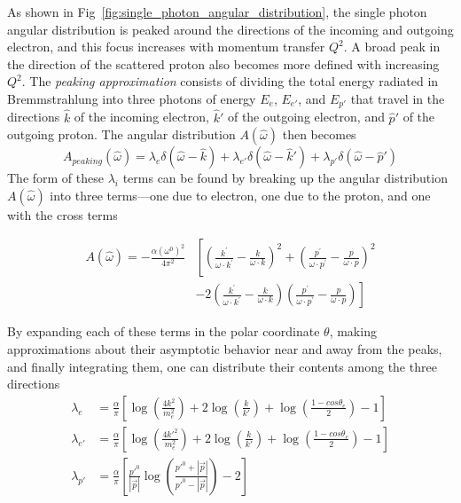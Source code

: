 As shown in Fig~\ref{fig:single_photon_angular_distribution}, the single
photon angular distribution is peaked around the directions of the incoming and
outgoing electron, and this focus increases with momentum transfer $Q^2$.
A broad peak in the direction of the scattered proton also becomes more defined
with increasing $Q^2$.
The \textit{peaking approximation} consists of dividing the total energy
radiated in Bremmstrahlung into three photons of energy $E_e$, $E_{e'}$, and
$E_{p'}$ that travel in the directions
$\hat{k}$ of the incoming electron,
$\hat{k}'$ of the outgoing electron,
and
$\hat{p}'$ of the outgoing proton.
The angular distribution $A(\hat{\omega})$ then becomes
\begin{equation}
    A_{peaking}(\hat{\omega}) = \lambda_{e}  \delta(\hat{\omega}-\hat{k}) +
                                \lambda_{e'} \delta(\hat{\omega}-\hat{k}') +
                                \lambda_{p'} \delta(\hat{\omega}-\hat{p}')
\end{equation}
The form of these $\lambda_i$ terms can be found by breaking up the angular
distribution $A(\hat{\omega})$ into three terms---one due to electron, one
due to the proton, and one with the cross terms

\begin{align}
    A(\hat{\omega}) = -\frac{\alpha(\omega^0)^2}{4\pi^{2}}
                        &\left[\left(\frac{k^{\prime}}{\omega \cdot k^{\prime}}-\frac{k}{\omega \cdot k}\right)^{2}
                        + \left(\frac{p^{\prime}}{\omega \cdot p^{\prime}}-\frac{p}{\omega \cdot p}\right)^{2}\right.\nonumber\\
                        &\left.-2\left(\frac{k^{\prime}}{\omega \cdot k^{\prime}}-\frac{k}{\omega \cdot k}\right)
                        \left(\frac{p^{\prime}}{\omega \cdot p^{\prime}}-\frac{p}{\omega \cdot p}\right) \right]
\end{align}

By expanding each of these terms in the polar coordinate $\theta$,
making approximations about their asymptotic behavior near and away from the peaks,
and finally integrating them, one can distribute their contents among the three
directions
\begin{align}
    \lambda_e    &= \frac{\alpha}{\pi}\left[\log\left(\frac{4k^2}{m_e^2}\right) +
                                        2\log\left(\frac{k}{k'}\right) +
                                        \log\left(\frac{1-cos\theta_e}{2}\right)
                                        -1\right] \\
    \lambda_{e'} &= \frac{\alpha}{\pi}\left[\log\left(\frac{4k'^2}{m_e^2}\right) +
                                        2\log\left(\frac{k}{k'}\right) +
                                        \log\left(\frac{1-cos\theta_e}{2}\right)
                                        -1\right] \\
    \lambda_{p'} &= \frac{\alpha}{\pi}
                  \left[
                      \frac{p'^0}{|\vec{p}|}
                      \log\left(\frac{p'^0+|\vec{p}|}
                                     {p'^0-|\vec{p}|}\right)
                      - 2
                  \right]
\end{align}

